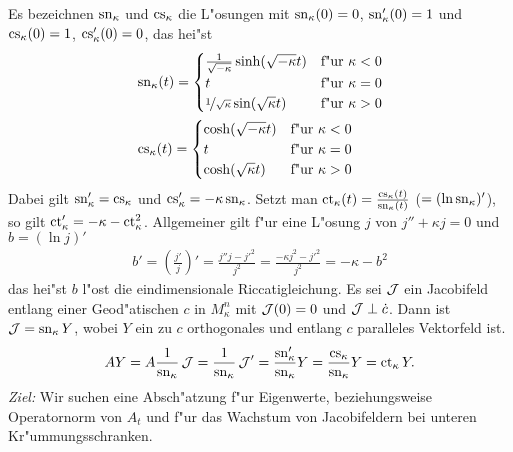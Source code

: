 Es bezeichnen $\operatorname{sn}_\kappa$ und $\operatorname{cs}_\kappa$ die L"osungen mit $\operatorname{sn}_\kappa(0) = 0$, $\operatorname{sn}_\kappa'(0) = 1$ und $\operatorname{cs}_\kappa(0) = 1$, $\operatorname{cs}_\kappa'(0) = 0$, das hei"st
\begin{align*}
  &\operatorname{sn}_\kappa(t) = \begin{cases}
    \frac{1}{\sqrt{-\kappa}} \sinh(\sqrt{-\kappa}t) & \text{f"ur } \kappa < 0\\
    t & \text{f"ur } \kappa = 0\\
    \nicefrac{1}{\sqrt{\kappa}} \sin(\sqrt{\kappa}t) & \text{f"ur } \kappa > 0\\
  \end{cases}\\
  &\operatorname{cs}_\kappa(t) = \begin{cases}
    \cosh(\sqrt{-\kappa}t) & \text{f"ur } \kappa < 0\\
    t & \text{f"ur } \kappa = 0\\
    \cosh(\sqrt{\kappa}t) & \text{f"ur } \kappa > 0\\
  \end{cases}
\end{align*}
Dabei gilt $\operatorname{sn}_\kappa' = \operatorname{cs}_\kappa$ und $\operatorname{cs}_\kappa' = -\kappa \operatorname{sn}_\kappa$. Setzt man $\operatorname{ct}_\kappa(t) = \frac{\operatorname{cs}_\kappa(t)}{\operatorname{sn}_\kappa(t)}$ ($= (\ln \operatorname{sn}_\kappa)'$), so gilt $\operatorname{ct}_\kappa' = -\kappa - \operatorname{ct}_\kappa^2$. Allgemeiner gilt f"ur eine L"osung $j$ von $j'' + \kappa j = 0$ und $b = (\ln j)'$
\begin{align*}
  b' = \left( \frac{j'}{j} \right)' = \frac{j''j - {j'}^2}{j^2} = \frac{-\kappa j^2 - {j'}^2}{j^2} = -\kappa - b^2
\end{align*}
das hei"st $b$ l"ost die eindimensionale Riccatigleichung.
Es sei $\operatorname{\mathcal{J}}$ ein Jacobifeld entlang einer Geod"atischen $c$ in $M^n_{\kappa}$ mit $\operatorname{\mathcal{J}}(0) = 0$ und $\operatorname{\mathcal{J}} \perp \dot c$.
Dann ist $\operatorname{\mathcal{J}} = \operatorname{sn}_{\kappa}Y$, wobei $Y$ ein zu $c$ orthogonales und entlang $c$ paralleles Vektorfeld ist.
\begin{align*}
  AY = A \frac{1}{\operatorname{sn}_{\kappa}}\operatorname{\mathcal{J}}
  = \frac{1}{\operatorname{sn}_{\kappa}}\operatorname{\mathcal{J}}'
  = \frac{\operatorname{sn}'_{\kappa}}{\operatorname{sn}_{\kappa}}Y
  = \frac{\operatorname{cs}_{\kappa}}{\operatorname{sn}_{\kappa}}Y
  = \operatorname{ct}_{\kappa}Y.
\end{align*}
\emph{Ziel:} Wir suchen eine Absch"atzung f"ur Eigenwerte, beziehungsweise Operatornorm von $A_t$ und f"ur das Wachstum von Jacobifeldern bei unteren Kr"ummungsschranken.

